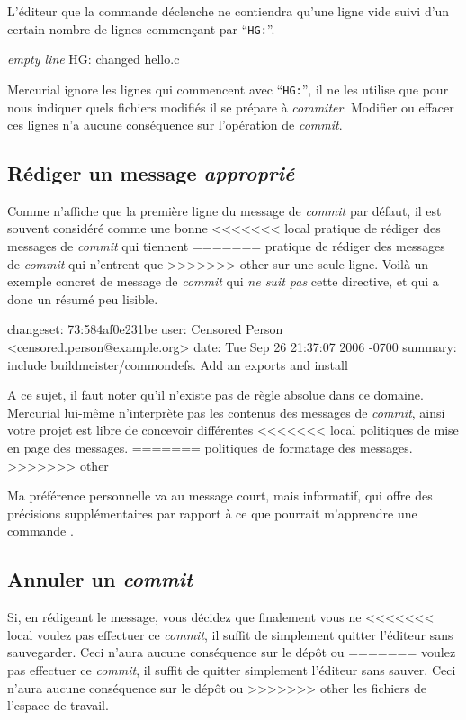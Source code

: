 L'éditeur que la commande  déclenche ne contiendra
qu'une ligne vide suivi d'un certain nombre de lignes commençant
par ``\texttt{HG:}''.
\begin{codesample2}
  \emph{empty line}
  HG: changed hello.c
\end{codesample2}
Mercurial ignore les lignes qui commencent avec ``\texttt{HG:}'', il 
ne les utilise que pour nous indiquer quels fichiers modifiés il se 
prépare à \textit{commiter}. Modifier ou effacer ces lignes n'a 
aucune conséquence sur l'opération de \textit{commit}.

\subsection{Rédiger un message \textit{approprié}}

Comme  n'affiche que la première ligne du message de
\textit{commit} par défaut, il est souvent considéré comme une bonne
<<<<<<< local
pratique de rédiger des messages de \textit{commit} qui tiennent
=======
pratique de rédiger des messages de \textit{commit} qui n'entrent que 
>>>>>>> other
sur une seule ligne. Voilà un exemple concret de message de 
\textit{commit} qui \emph{ne suit pas} cette directive, et qui a donc
un résumé peu lisible.
\begin{codesample2}
  changeset:   73:584af0e231be
  user:        Censored Person <censored.person@example.org>
  date:        Tue Sep 26 21:37:07 2006 -0700
  summary:     include buildmeister/commondefs.   Add an exports and install
\end{codesample2}

A ce sujet, il faut noter qu'il n'existe pas de règle absolue dans ce 
domaine. Mercurial lui-même n'interprète pas les contenus des messages
de \textit{commit}, ainsi votre projet est libre de concevoir différentes
<<<<<<< local
politiques de mise en page des messages.
=======
politiques de formatage des messages.
>>>>>>> other

Ma préférence personnelle va au message court, mais informatif, qui offre
des précisions supplémentaires par rapport à ce que pourrait m'apprendre une commande
.

\subsection{Annuler un \textit{commit}}

Si, en rédigeant le message, vous décidez que finalement vous ne 
<<<<<<< local
voulez pas effectuer ce \textit{commit}, il suffit de simplement quitter
l'éditeur sans sauvegarder. Ceci n'aura aucune conséquence sur le dépôt ou
=======
voulez pas effectuer ce \textit{commit}, il suffit de quitter simplement
l'éditeur sans sauver. Ceci n'aura aucune conséquence sur le dépôt ou
>>>>>>> other
les fichiers de l'espace de travail.

